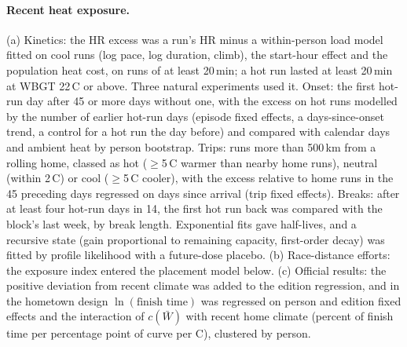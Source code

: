 \documentclass[12pt]{article}
\newcommand{\degC}{\,\textdegree C}
\begin{document}
\paragraph{Recent heat exposure.} (a) Kinetics: the HR excess was a run's HR minus a within-person load model fitted on cool runs (log pace, log duration, climb), the start-hour effect and the population heat cost, on runs of at least 20\,min; a hot run lasted at least 20\,min at WBGT 22\degC{} or above. Three natural experiments used it. Onset: the first hot-run day after 45 or more days without one, with the excess on hot runs modelled by the number of earlier hot-run days (episode fixed effects, a days-since-onset trend, a control for a hot run the day before) and compared with calendar days and ambient heat by person bootstrap. Trips: runs more than 500\,km from a rolling home, classed as hot ($\geq$5\degC{} warmer than nearby home runs), neutral (within 2\degC) or cool ($\geq$5\degC{} cooler), with the excess relative to home runs in the 45 preceding days regressed on days since arrival (trip fixed effects). Breaks: after at least four hot-run days in 14, the first hot run back was compared with the block's last week, by break length. Exponential fits gave half-lives, and a recursive state (gain proportional to remaining capacity, first-order decay) was fitted by profile likelihood with a future-dose placebo. (b) Race-distance efforts: the exposure index entered the placement model below. (c) Official results: the positive deviation from recent climate was added to the edition regression, and in the hometown design $\ln(\text{finish time})$ was regressed on person and edition fixed effects and the interaction of $c(\bar W)$ with recent home climate (percent of finish time per percentage point of curve per \textdegree C), clustered by person.
\end{document}

